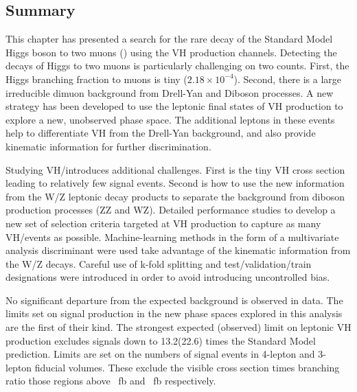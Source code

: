 \subsection{Summary}

This chapter has presented a search for the rare decay of the Standard Model Higgs boson to two muons (\hmm) using the VH production channels.
Detecting the decays of Higgs to two muons is particularly challenging on two counts.
First, the Higgs branching fraction to muons is tiny ($2.18\times10^{-4}$).
Second, there is a large irreducible dimuon background from Drell-Yan and Diboson processes.
A new strategy has been developed to use the leptonic final states of VH production to explore a new, unobserved phase space.
The additional leptons in these events help to differentiate VH from the Drell-Yan background, and also provide kinematic information for further discrimination.

Studying VH/\hmm introduces additional challenges.
First is the tiny VH cross section leading to relatively few signal events.
Second is how to use the new information from the W/Z leptonic decay products to separate the background from diboson production processes (ZZ and WZ).
Detailed performance studies to develop a new set of selection criteria targeted at VH production to capture as many VH/\hmm events as possible.
Machine-learning methods in the form of a multivariate analysis discriminant were used take advantage of the kinematic information from the W/Z decays.
Careful use of k-fold splitting and test/validation/train designations were introduced in order to avoid introducing uncontrolled bias.

No significant departure from the expected background is observed in data.
The limits set on signal production in the new phase spaces explored in this analysis are the first of their kind.
The strongest expected (observed) limit on leptonic VH production excludes signals down to 13.2(22.6) times the Standard Model prediction.
Limits are set on the numbers of signal events in 4-lepton and 3-lepton fiducial volumes.
These exclude the visible cross section times branching ratio those regions above ~fb and ~fb respectively.
